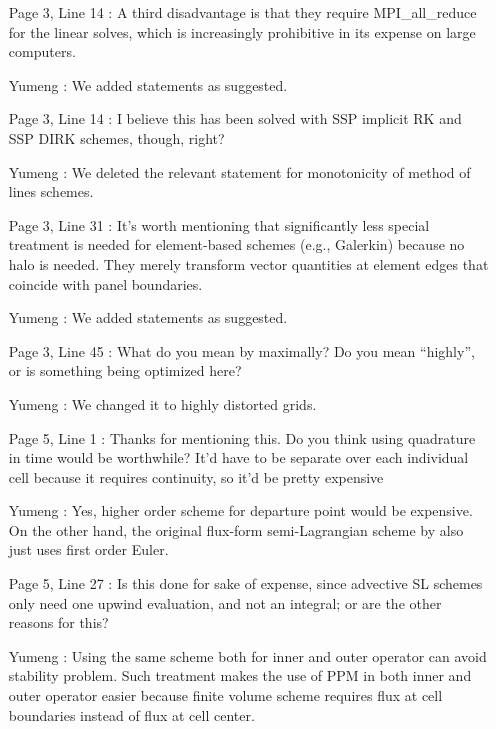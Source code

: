 \documentclass[12pt]{article}
\begin{document}
\begin{enumerate}
\item [Page 3, Line 14]: A third disadvantage is that they require MPI\_all\_reduce for the linear solves, which is increasingly prohibitive in its expense on large computers.

\item [Yumeng]: We added statements as suggested.

\item [Page 3, Line 14]: I believe this has been solved with SSP implicit RK and SSP DIRK schemes, though, right?

\item [Yumeng]: We deleted the relevant statement for monotonicity of method of lines schemes. 

\item [Page 3, Line 31]: It's worth mentioning that significantly less special treatment is needed for element-based schemes (e.g., Galerkin) because no halo is needed. They merely transform vector quantities at element edges that coincide with panel boundaries.

\item [Yumeng]: We added statements as suggested.

\item [Page 3, Line 45]: What do you mean by maximally? Do you mean ``highly'', or is something being optimized here?

\item [Yumeng]: We changed it to highly distorted grids. 

\item [Page 5, Line 1]: Thanks for mentioning this. Do you think using quadrature in time would be worthwhile? It'd have to be separate over each individual cell because it requires continuity, so it'd be pretty expensive

\item [Yumeng]: Yes, higher order scheme for departure point would be expensive. On the other hand, the original flux-form semi-Lagrangian scheme by \citep{LR96} also just uses first order Euler. 

\item [Page 5, Line 27]: Is this done for sake of expense, since advective SL schemes only need one upwind evaluation, and not an integral; or are the other reasons for this?

\item [Yumeng]: Using the same scheme both for inner and outer operator can avoid stability problem. Such treatment makes the use of PPM in both inner and outer operator easier because finite volume scheme requires flux at cell boundaries instead of flux at cell center.


\end{enumerate}
\end{document}
